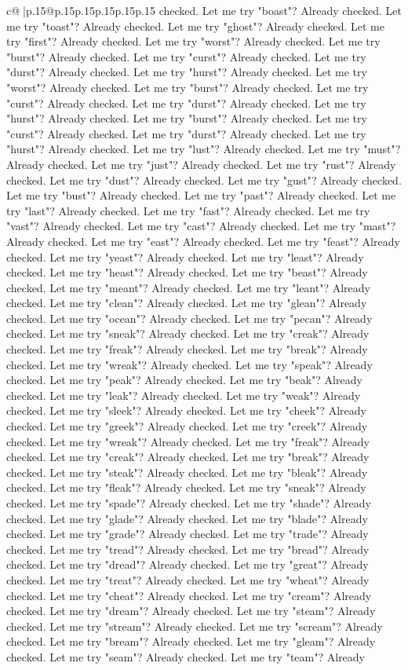 \documentclass{article}
\begin{document}
{\begin{supertabular}{c@{$\;$}|p{.15\linewidth}@{}p{.15\linewidth}p{.15\linewidth}p{.15\linewidth}p{.15\linewidth}p{.15\linewidth}}
{{{checked. Let me try "boast"? Already checked. Let me try "toast"? Already checked. Let me try "ghost"? Already checked. Let me try "first"? Already checked. Let me try "worst"? Already checked. Let me try "burst"? Already checked. Let me try "curst"? Already checked. Let me try "durst"? Already checked. Let me try "hurst"? Already checked. Let me try "worst"? Already checked. Let me try "burst"? Already checked. Let me try "curst"? Already checked. Let me try "durst"? Already checked. Let me try "hurst"? Already checked. Let me try "burst"? Already checked. Let me try "curst"? Already checked. Let me try "durst"? Already checked. Let me try "hurst"? Already checked. Let me try "lust"? Already checked. Let me try "must"? Already checked. Let me try "just"? Already checked. Let me try "rust"? Already checked. Let me try "dust"? Already checked. Let me try "gust"? Already checked. Let me try "bust"? Already checked. Let me try "past"? Already checked. Let me try "last"? Already checked. Let me try "fast"? Already checked. Let me try "vast"? Already checked. Let me try "cast"? Already checked. Let me try "mast"? Already checked. Let me try "east"? Already checked. Let me try "feast"? Already checked. Let me try "yeast"? Already checked. Let me try "least"? Already checked. Let me try "heast"? Already checked. Let me try "beast"? Already checked. Let me try "meant"? Already checked. Let me try "leant"? Already checked. Let me try "clean"? Already checked. Let me try "glean"? Already checked. Let me try "ocean"? Already checked. Let me try "pecan"? Already checked. Let me try "sneak"? Already checked. Let me try "creak"? Already checked. Let me try "freak"? Already checked. Let me try "break"? Already checked. Let me try "wreak"? Already checked. Let me try "speak"? Already checked. Let me try "peak"? Already checked. Let me try "beak"? Already checked. Let me try "leak"? Already checked. Let me try "weak"? Already checked. Let me try "sleek"? Already checked. Let me try "cheek"? Already checked. Let me try "greek"? Already checked. Let me try "creek"? Already checked. Let me try "wreak"? Already checked. Let me try "freak"? Already checked. Let me try "creak"? Already checked. Let me try "break"? Already checked. Let me try "steak"? Already checked. Let me try "bleak"? Already checked. Let me try "fleak"? Already checked. Let me try "sneak"? Already checked. Let me try "spade"? Already checked. Let me try "shade"? Already checked. Let me try "glade"? Already checked. Let me try "blade"? Already checked. Let me try "grade"? Already checked. Let me try "trade"? Already checked. Let me try "tread"? Already checked. Let me try "bread"? Already checked. Let me try "dread"? Already checked. Let me try "great"? Already checked. Let me try "treat"? Already checked. Let me try "wheat"? Already checked. Let me try "cheat"? Already checked. Let me try "cream"? Already checked. Let me try "dream"? Already checked. Let me try "steam"? Already checked. Let me try "stream"? Already checked. Let me try "scream"? Already checked. Let me try "bream"? Already checked. Let me try "gleam"? Already checked. Let me try "seam"? Already checked. Let me try "team"? Already }}}
\end{supertabular}}
\end{document}

